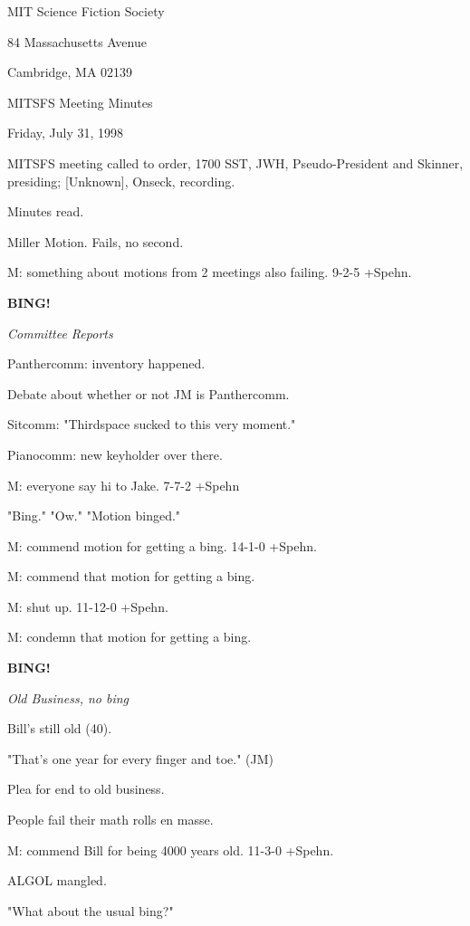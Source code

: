 \documentclass[12pt]{article}
\newcommand{\bing}{{\bf BING!} }
\newcommand{\goto}[1]{\bing \vskip 12pt \centerline{{\em{#1}}}}
\begin{document}
\begin{center}

MIT Science Fiction Society 

84 Massachusetts Avenue

Cambridge, MA 02139

\vspace{12pt}

MITSFS Meeting Minutes 

Friday, July 31, 1998

\end{center}
 
\vspace{18pt}

\setlength{\parskip}{6pt}

\noindent
MITSFS meeting called to order, 1700 SST,
JWH, Pseudo-President and Skinner, presiding; [Unknown], Onseck, recording.

Minutes read.

Miller Motion. Fails, no second.

M: something about motions from 2 meetings also failing. 9-2-5 +Spehn.

\goto{Committee Reports}

Panthercomm: inventory happened.

Debate about whether or not JM is Panthercomm.

Sitcomm: "Thirdspace sucked to this very moment."

Pianocomm: new keyholder over there.

M: everyone say hi to Jake. 7-7-2 +Spehn

"Bing." "Ow." "Motion binged."

M: commend motion for getting a bing. 14-1-0 +Spehn.

M: commend that motion for getting a bing.

M: shut up. 11-12-0 +Spehn.

M: condemn that motion for getting a bing.

\goto{Old Business, no bing}

Bill's still old (40).

"That's one year for every finger and toe." (JM)

Plea for end to old business.

People fail their math rolls en masse.

M: commend Bill for being 4000 years old. 11-3-0 +Spehn.

ALGOL mangled.

"What about the usual bing?"
\end{document}
